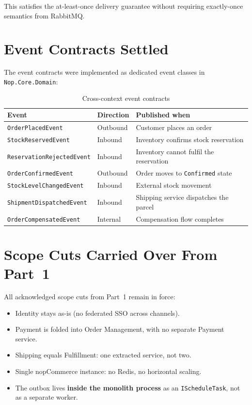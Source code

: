 This satisfies the at-least-once delivery guarantee without requiring exactly-once semantics from RabbitMQ.

\section{Event Contracts Settled}

The event contracts were implemented as dedicated event classes in \texttt{Nop.Core.Domain}:

\begin{table}[H]
\centering
\caption{Cross-context event contracts}
\label{tab:events}
\begin{tabularx}{\textwidth}{@{} L{5cm} L{2.5cm} X @{}}
\toprule
\textbf{Event} & \textbf{Direction} & \textbf{Published when} \\
\midrule
\texttt{OrderPlacedEvent} & Outbound & Customer places an order \\
\texttt{StockReservedEvent} & Inbound & Inventory confirms stock reservation \\
\texttt{Reservation\-Rejected\-Event} & Inbound & Inventory cannot fulfil the reservation \\
\texttt{OrderConfirmedEvent} & Outbound & Order moves to \texttt{Confirmed} state \\
\texttt{StockLevelChangedEvent} & Inbound & External stock movement \\
\texttt{ShipmentDispatchedEvent} & Inbound & Shipping service dispatches the parcel \\
\texttt{OrderCompensatedEvent} & Internal & Compensation flow completes \\
\bottomrule
\end{tabularx}
\end{table}

\section{Scope Cuts Carried Over From Part~1}

All acknowledged scope cuts from Part~1 remain in force:

\begin{scopebox}
\begin{itemize}
    \item Identity stays as-is (no federated SSO across channels).
    \item Payment is folded into Order Management, with no separate Payment service.
    \item Shipping equals Fulfillment: one extracted service, not two.
    \item Single nopCommerce instance: no Redis, no horizontal scaling.
    \item The outbox lives \textbf{inside the monolith process} as an \texttt{IScheduleTask}, not as a separate worker.
\end{itemize}
\end{scopebox}
